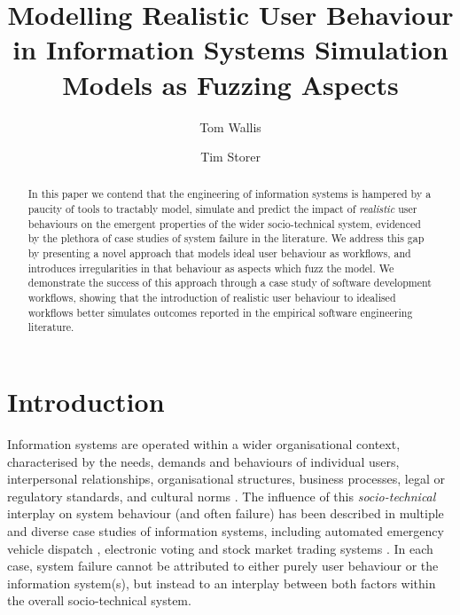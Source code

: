 \documentclass{llncs}
\title{Modelling Realistic User Behaviour in Information Systems Simulation Models as Fuzzing Aspects}
\author{Tom Wallis\orcidID{} \and Tim Storer\orcidID{}}
\institute{University of Glasgow, Glasgow, Scotland.\\
  \email{w.wallis.1@research.gla.ac.uk}\\
  \email{timothy.storer@glasgow.ac.uk}
}
\begin{document}

\maketitle


\begin{abstract}
  In this paper we contend that the engineering of information systems is hampered by a paucity of tools to tractably
  model, simulate and predict the impact of \emph{realistic} user behaviours on the emergent properties of the wider
  socio-technical system, evidenced by the plethora of case studies of system failure in the literature.  We address
  this gap by presenting a novel approach that models ideal user behaviour as workflows, and introduces irregularities
  in that behaviour as aspects which fuzz the model. We demonstrate the success of this approach through a case study of
  software development workflows, showing that the introduction of realistic user behaviour to idealised workflows
  better simulates outcomes reported in the empirical software engineering literature.
\end{abstract}


\section{Introduction}
\label{sec:introduction}


Information systems are operated within a wider organisational context, characterised by the needs, demands and
behaviours of individual users, interpersonal relationships, organisational structures, business processes, legal or
regulatory standards, and cultural norms \citep{bade07structures,pentland05organisational}.  The influence of this
\emph{socio-technical} interplay on system behaviour (and often failure) has been described in multiple and diverse case
studies of information systems, including automated emergency vehicle dispatch \citep{robinson96limited}, electronic
voting \citep{lock07observations} and stock market trading systems \citep{cftc-sec10findings}. In each case, system
failure cannot be attributed to either purely user behaviour or the information system(s), but instead to an interplay
between both factors within the overall socio-technical system.
\end{document}
